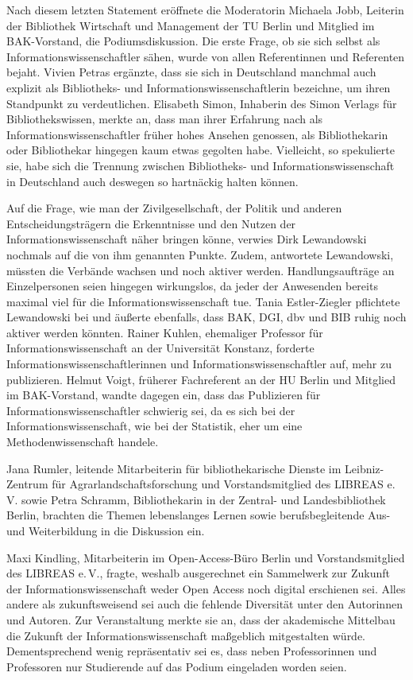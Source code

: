 \documentclass[a4paper,
fontsize=11pt,
oneside,
numbers=noperiodatend,
parskip=half-,
bibliography=totoc,
final
]{scrartcl}
\begin{document}
Nach diesem letzten Statement eröffnete die Moderatorin Michaela Jobb,
Leiterin der Bibliothek Wirtschaft und Management der TU Berlin und
Mitglied im BAK-Vorstand, die Podiumsdiskussion. Die erste Frage, ob sie
sich selbst als Informationswissenschaftler sähen, wurde von allen
Referentinnen und Referenten bejaht. Vivien Petras ergänzte, dass sie
sich in Deutschland manchmal auch explizit als Bibliotheks- und
Informationswissenschaftlerin bezeichne, um ihren Standpunkt zu
verdeutlichen. Elisabeth Simon, Inhaberin des Simon Verlags für
Bibliothekswissen, merkte an, dass man ihrer Erfahrung nach als
Informationswissenschaftler früher hohes Ansehen genossen, als
Bibliothekarin oder Bibliothekar hingegen kaum etwas gegolten habe.
Vielleicht, so spekulierte sie, habe sich die Trennung zwischen
Bibliotheks- und Informationswissenschaft in Deutschland auch deswegen
so hartnäckig halten können.

Auf die Frage, wie man der Zivilgesellschaft, der Politik und anderen
Entscheidungsträgern die Erkenntnisse und den Nutzen der
Informationswissenschaft näher bringen könne, verwies Dirk Lewandowski
nochmals auf die von ihm genannten Punkte. Zudem, antwortete
Lewandowski, müssten die Verbände wachsen und noch aktiver werden.
Handlungsaufträge an Einzelpersonen seien hingegen wirkungslos, da jeder
der Anwesenden bereits maximal viel für die Informationswissenschaft
tue. Tania Estler-Ziegler pflichtete Lewandowski bei und äußerte
ebenfalls, dass BAK, DGI, dbv und BIB ruhig noch aktiver werden könnten.
Rainer Kuhlen, ehemaliger Professor für Informationswissenschaft an der
Universität Konstanz, forderte Informationswissenschaftlerinnen und
Informationswissenschaftler auf, mehr zu publizieren. Helmut Voigt,
früherer Fachreferent an der HU Berlin und Mitglied im BAK-Vorstand,
wandte dagegen ein, dass das Publizieren für Informationswissenschaftler
schwierig sei, da es sich bei der Informationswissenschaft, wie bei der
Statistik, eher um eine Methodenwissenschaft handele.

Jana Rumler, leitende Mitarbeiterin für bibliothekarische Dienste im
Leibniz-Zentrum für Agrarlandschaftsforschung und Vorstandsmitglied des
LIBREAS e.\,V. sowie Petra Schramm, Bibliothekarin in der Zentral- und
Landesbibliothek Berlin, brachten die Themen lebenslanges Lernen sowie
berufsbegleitende Aus- und Weiterbildung in die Diskussion ein.

Maxi Kindling, Mitarbeiterin im Open-Access-Büro Berlin und
Vorstandsmitglied des LIBREAS e.\,V., fragte, weshalb ausgerechnet ein
Sammelwerk zur Zukunft der Informationswissenschaft weder Open Access
noch digital erschienen sei. Alles andere als zukunftsweisend sei auch
die fehlende Diversität unter den Autorinnen und Autoren. Zur
Veranstaltung merkte sie an, dass der akademische Mittelbau die Zukunft
der Informationswissenschaft maßgeblich mitgestalten würde.
Dementsprechend wenig repräsentativ sei es, dass neben Professorinnen
und Professoren nur Studierende auf das Podium eingeladen worden seien.
\end{document}
